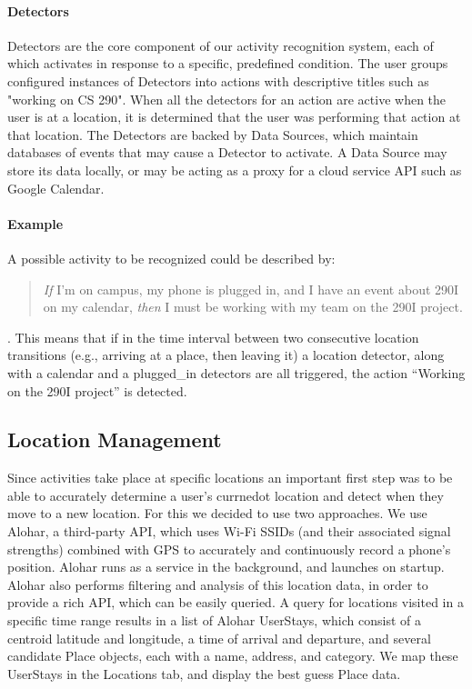 \documentclass{acm_proc_article-sp}
\begin{document}
\paragraph{Detectors}  Detectors are the core component of our activity recognition system, each of which activates in response to a specific, predefined condition. 
The user groups configured instances of Detectors into actions with descriptive titles such as "working on CS 290". When all the detectors for an action are active when the user is at a location, it is determined that the user was performing that action at that location. The Detectors are backed by Data Sources, which maintain databases of events that may cause a Detector to activate. A Data Source may store its data locally, or may be acting as a proxy for a cloud service API such as Google Calendar. 

\paragraph{Example} A possible activity to be recognized could be described by:
\begin{quote}{\it If} I'm on campus, my phone is plugged in, and I have an event about 290I on my calendar, {\it then} I must be working with my team on the 290I project.\end{quote}. This means that if in the time interval between two consecutive location transitions (e.g., arriving at a place, then leaving it) a location detector, along with a calendar and a plugged\_in detectors are all triggered, the action ``Working on the 290I project'' is detected.


\subsection {Location Management}

Since activities take place at specific locations an important first step was to be able to accurately determine a user's currnedot location and detect when they move to a new location. For this we decided to use two approaches. We use Alohar, a third-party API, which uses Wi-Fi SSIDs (and their associated signal strengths) combined with GPS to accurately and continuously record a phone's position. Alohar runs as a service in the background, and launches on startup. Alohar also performs filtering and analysis of this location data, in order to provide a rich API, which can be easily queried. A query for locations visited in a specific time range results in a list of Alohar UserStays, which consist of a centroid latitude and longitude, a time of arrival and departure, and several candidate Place objects, each with a name, address, and category. We map these UserStays in the Locations tab, and display the best guess Place data.
\end{document}
